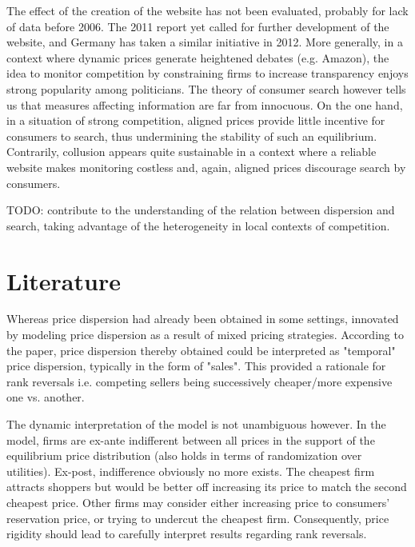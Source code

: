 \documentclass[11pt]{article}
\begin{document}
The effect of the creation of the website has not been evaluated, probably for lack of data before 2006. The 2011 report yet called for further development of the website, and Germany has taken a similar initiative in 2012. More generally, in a context where dynamic prices generate heightened debates (e.g. Amazon), the idea to monitor competition by constraining firms to increase transparency enjoys strong popularity among politicians. The theory of consumer search however tells us that measures affecting information are far from innocuous. On the one hand, in a situation of strong competition, aligned prices provide little incentive for consumers to search, thus undermining the stability of such an equilibrium. Contrarily, collusion appears quite sustainable in a context where a reliable website makes monitoring costless and, again, aligned prices discourage search by consumers.

TODO: contribute to the understanding of the relation between dispersion and search, taking advantage of the heterogeneity in local contexts of competition.

\section{Literature}

Whereas price dispersion had already been obtained in some settings, \cite{VAR80} innovated by modeling price dispersion as a result of mixed pricing strategies. According to the paper, price dispersion thereby obtained could be interpreted as "temporal" price dispersion, typically in the form of "sales". This provided a rationale for rank reversals i.e. competing sellers being successively cheaper/more expensive one vs. another.

The dynamic interpretation of the model is not unambiguous however. In the model, firms are ex-ante indifferent between all prices in the support of the equilibrium price distribution (also holds in terms of randomization over utilities). Ex-post, indifference obviously no more exists. The cheapest firm attracts shoppers but would be better off increasing its price to match the second cheapest price. Other firms may consider either increasing price to consumers' reservation price, or trying to undercut the cheapest firm. Consequently, price rigidity should lead to carefully interpret results regarding rank reversals.
\end{document}
